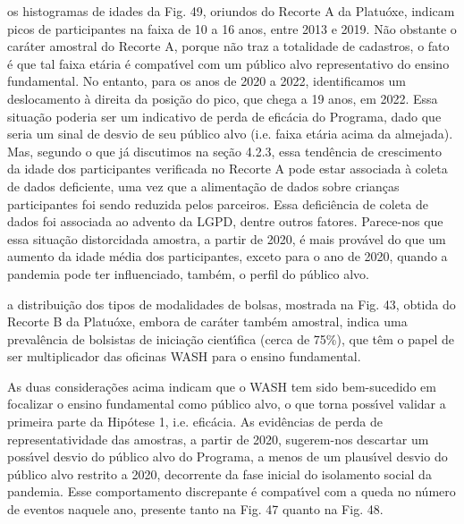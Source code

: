 \documentclass[
12pt,		%
openright,	%
twoside,  %
a4paper,			%
chapter=TITLE,		%
english,			%
french,				%
spanish,			%
brazil				%
]{USPSC-classe/USPSC}
\begin{document}
\begin{alineas}
\item os histogramas de idades da Fig. 49, oriundos do Recorte A da Platu\'oxe, indicam picos de participantes na faixa de 10 a 16 anos, entre  2013 e 2019. N\~ao obstante o car\'ater amostral do Recorte A, porque n\~ao traz a totalidade de cadastros, o fato \'e que tal faixa et\'aria \'e compat\'{\i}vel com um p\'ublico alvo representativo do ensino fundamental. No entanto, para os anos de 2020 a 2022, identificamos um deslocamento \`a direita da posi\c{c}\~ao do pico, que chega a 19 anos, em 2022. Essa situa\c{c}\~ao poderia ser um indicativo de perda de efic\'acia do Programa, dado que seria um sinal de desvio de seu p\'ublico alvo (i.e. faixa et\'aria acima da almejada). Mas, segundo o que j\'a discutimos na se\c{c}\~ao 4.2.3, essa tend\^encia de crescimento da idade dos participantes verificada no Recorte A pode estar associada \`a coleta de dados deficiente, uma vez que a alimenta\c{c}\~ao de dados sobre crian\c{c}as participantes foi sendo reduzida pelos parceiros. Essa defici\^encia de coleta de dados foi associada ao advento da LGPD, dentre outros fatores.  Parece-nos que essa situa\c{c}\~ao \textquotedbl distorcida\textquotedbl   da amostra, a partir de 2020, \'e  mais prov\'avel do que um aumento da idade m\'edia dos participantes, exceto para o ano de 2020, quando a pandemia pode ter influenciado, tamb\'em, o perfil do p\'ublico alvo.
\item a distribui\c{c}\~ao dos tipos de modalidades de bolsas, mostrada na Fig. 43, obtida do Recorte B da Platu\'oxe, embora de car\'ater tamb\'em amostral, indica uma preval\^encia de bolsistas de inicia\c{c}\~ao cient\'{\i}fica (cerca de 75\%), que t\^em o papel de ser  multiplicador das oficinas WASH para o ensino fundamental.
\end{alineas}

As duas considera\c{c}\~oes acima indicam que o WASH tem sido bem-sucedido em focalizar o ensino fundamental como p\'ublico alvo, o que torna poss\'{\i}vel validar a primeira parte da Hip\'otese 1, i.e. efic\'acia. As evid\^encias de perda de representatividade das amostras, a partir de 2020, sugerem-nos descartar um poss\'{\i}vel desvio do p\'ublico alvo do Programa, a menos de um plaus\'{\i}vel desvio do p\'ublico alvo restrito a 2020, decorrente da fase inicial do isolamento social da pandemia. Esse comportamento discrepante \'e compat\'{\i}vel com a queda no n\'umero de eventos naquele ano, presente tanto na Fig. 47 quanto na Fig. 48.
\end{document}
